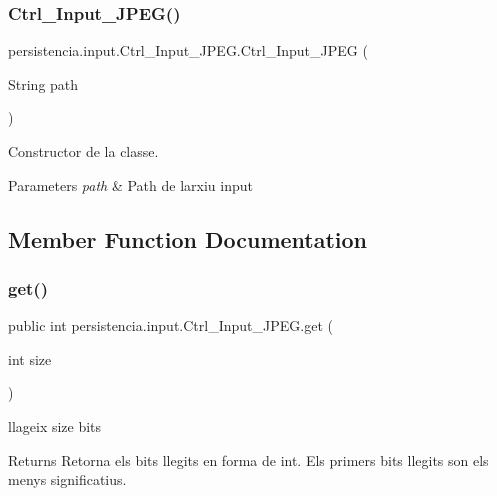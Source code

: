 \subsubsection{\texorpdfstring{Ctrl\+\_\+\+Input\+\_\+\+J\+P\+E\+G()}{Ctrl\_Input\_JPEG()}}
{\footnotesize\ttfamily persistencia.\+input.\+Ctrl\+\_\+\+Input\+\_\+\+J\+P\+E\+G.\+Ctrl\+\_\+\+Input\+\_\+\+J\+P\+EG (\begin{DoxyParamCaption}\item[{String}]{path }\end{DoxyParamCaption})\hspace{0.3cm}{\ttfamily [inline]}}



Constructor de la classe. 


\begin{DoxyParams}{Parameters}
{\em path} & Path de l\textquotesingle{}arxiu input \\
\hline
\end{DoxyParams}


\subsection{Member Function Documentation}
\mbox{\label{classpersistencia_1_1input_1_1Ctrl__Input__JPEG_a702b13d096ba57f06b242987f0dbf4ec}} 
\subsubsection{\texorpdfstring{get()}{get()}}
{\footnotesize\ttfamily public int persistencia.\+input.\+Ctrl\+\_\+\+Input\+\_\+\+J\+P\+E\+G.\+get (\begin{DoxyParamCaption}\item[{int}]{size }\end{DoxyParamCaption})\hspace{0.3cm}{\ttfamily [inline]}}

llageix \textquotesingle{}size\textquotesingle{} bits \begin{DoxyReturn}{Returns}
Retorna els bits llegits en forma de int. Els primers bits llegits son els menys significatius. 
\end{DoxyReturn}
\mbox{\label{classpersistencia_1_1input_1_1Ctrl__Input__JPEG_a173716ac8d17365965ede95f99a8e65a}} 
